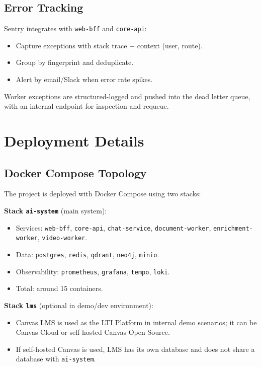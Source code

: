 \subsection{Error Tracking}

Sentry integrates with \texttt{web-bff} and \texttt{core-api}:

\begin{itemize}
    \item Capture exceptions with stack trace + context (user, route).
    \item Group by fingerprint and deduplicate.
    \item Alert by email/Slack when error rate spikes.
\end{itemize}

Worker exceptions are structured-logged and pushed into the dead letter
queue, with an internal endpoint for inspection and requeue.

\section{Deployment Details}
\label{appendix:deployment-details}

\subsection{Docker Compose Topology}

The project is deployed with Docker Compose using two stacks:

\textbf{Stack \texttt{ai-system}} (main system):
\begin{itemize}
    \item Services: \texttt{web-bff}, \texttt{core-api},
          \texttt{chat-service}, \texttt{document-worker},
          \texttt{enrichment-worker}, \texttt{video-worker}.
    \item Data: \texttt{postgres}, \texttt{redis}, \texttt{qdrant},
          \texttt{neo4j}, \texttt{minio}.
    \item Observability: \texttt{prometheus}, \texttt{grafana},
          \texttt{tempo}, \texttt{loki}.
    \item Total: around 15 containers.
\end{itemize}

\textbf{Stack \texttt{lms}} (optional in demo/dev environment):
\begin{itemize}
    \item Canvas LMS is used as the LTI Platform in internal demo
          scenarios; it can be Canvas Cloud or self-hosted Canvas Open
          Source.
    \item If self-hosted Canvas is used, LMS has its own database and does
          not share a database with \texttt{ai-system}.
\end{itemize}

